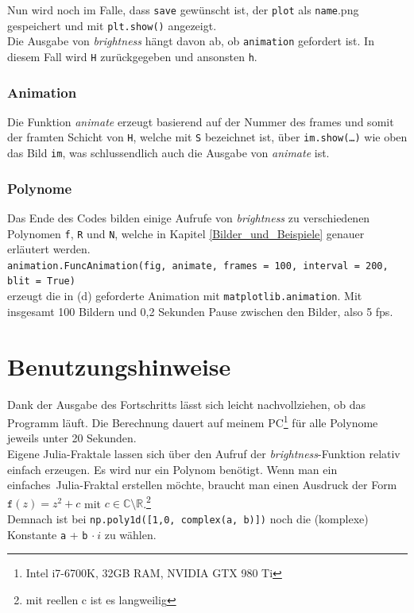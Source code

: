 \documentclass[12pt]{scrartcl}
\newcommand\tab[1][1cm]{\hspace*{#1}}
\begin{document}
Nun wird noch im Falle, dass \texttt{save} gewünscht ist, der \texttt{plot} als \texttt{name}.png gespeichert und mit \texttt{plt.show()} angezeigt.\\

Die Ausgabe von \textit{brightness} hängt davon ab, ob \texttt{animation} gefordert ist. In diesem Fall wird \texttt{H} zurückgegeben und ansonsten \texttt{h}.

\subsubsection{Animation}
Die Funktion \textit{animate} erzeugt basierend auf der Nummer des frames und somit der framten Schicht von \texttt{H}, welche mit \texttt{S} bezeichnet ist, über \texttt{im.show(\dots)} wie oben das Bild \texttt{im}, was schlussendlich auch die Ausgabe von \textit{animate} ist.

\subsubsection{Polynome}
Das Ende des Codes bilden einige Aufrufe von \textit{brightness} zu verschiedenen Polynomen \texttt{f}, \texttt{R} und \texttt{N}, welche in Kapitel \ref{Bilder_und_Beispiele} genauer erläutert werden.\\

\tab \texttt{animation.FuncAnimation(fig, animate, frames = 100, interval = 200, \\ \tab \tab blit = True)}\\

erzeugt die in (d) geforderte Animation mit \texttt{matplotlib.animation}. Mit insgesamt 100 Bildern und 0,2 Sekunden Pause zwischen den Bilder, also 5 fps.

\section{Benutzungshinweise}
Dank der Ausgabe des Fortschritts lässt sich leicht nachvollziehen, ob das Programm läuft. Die Berechnung dauert auf meinem PC\footnote[1]{Intel i7-6700K, 32GB RAM, NVIDIA GTX 980 Ti} für alle Polynome jeweils unter 20 Sekunden.\\

Eigene Julia-Fraktale lassen sich über den Aufruf der \textit{brightness}-Funktion relativ einfach erzeugen.
Es wird nur ein Polynom benötigt. Wenn man ein \glqq einfaches\grqq ~Julia-Fraktal erstellen möchte, braucht man einen Ausdruck der Form $\texttt{f}(z) = z^2 + c$ mit $c \in \mathbb{C} \setminus \mathbb{R}$.\footnote[2]{mit reellen c ist es langweilig}\\
Demnach ist bei \texttt{np.poly1d([1,0, complex(a, b)])} noch die (komplexe) Konstante \texttt{a} + \texttt{b} $\cdot ~i$ zu wählen.\\
\end{document}
